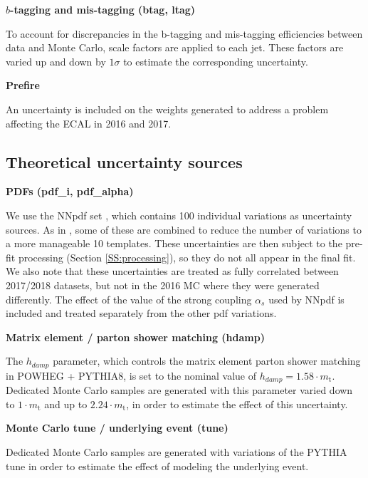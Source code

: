 \par \noindent
\textbf{$b$-tagging and mis-tagging (btag, ltag)}

To account for discrepancies in the b-tagging and mis-tagging efficiencies between data and Monte Carlo, scale factors are applied to each jet. These factors are varied up and down by $1\sigma$ to estimate the corresponding uncertainty.

\par \noindent
\textbf{Prefire }

An uncertainty is included on the weights generated to address a problem affecting the ECAL in 2016 and 2017.

\subsection*{Theoretical uncertainty sources}




\par \noindent
\textbf{PDFs (pdf\_i, pdf\_alpha)}

We use the NNpdf set \cite{NNPDF}, which contains 100 individual variations as uncertainty sources.  As in \cite{ytpaper}, some of these are combined to reduce the number of variations to a more manageable 10 templates. These uncertainties are then subject to the pre-fit processing (Section \ref{SS:processing}), so they do not all appear in the final fit. We also note that these uncertainties are treated as fully correlated between 2017/2018 datasets, but not in the 2016 MC where they were generated differently.
The effect of the value of the strong coupling $\alpha_s$ used by NNpdf is included and treated separately from the other pdf variations.



\par \noindent
\textbf{Matrix element / parton shower matching (hdamp)}

The $h_{damp}$ parameter, which controls the matrix element parton shower matching in \small\textsc{POWHEG + PYTHIA8}, is set to the nominal value of $h_{damp}= 1.58 \cdot m_\mathrm{t}$. Dedicated Monte Carlo samples are generated with this parameter varied down to $1 \cdot m_\mathrm{t}$ and up to $2.24 \cdot m_\mathrm{t}$, in order to estimate the effect of this uncertainty.

\par \noindent
\textbf{Monte Carlo tune / underlying event (tune)}

Dedicated Monte Carlo samples are generated with variations of the PYTHIA tune in order to estimate the effect of modeling the underlying event.





